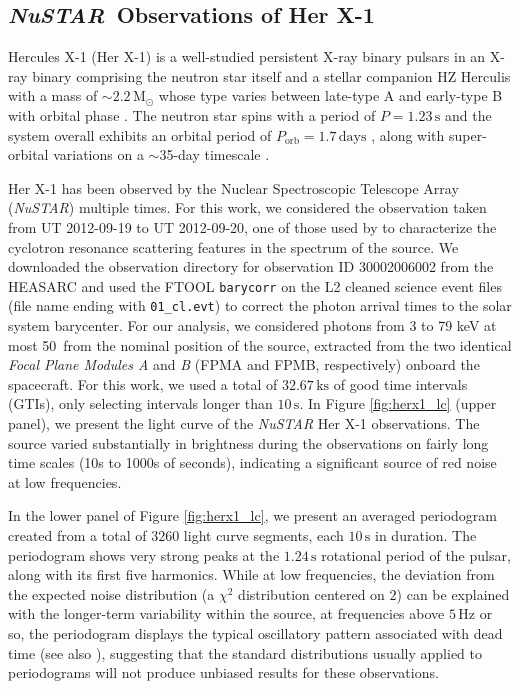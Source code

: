 \documentclass[12pt]{emulateapj}
\newcommand{\project}[1]{\textsl{#1}}
\newcommand{\nustar}{\project{NuSTAR}\xspace}
\begin{document}
\subsection{\nustar\ Observations of Her X-1}

\begin{bf}
Hercules X-1 (Her X-1) is a well-studied persistent X-ray binary pulsars \citep{tananbaum1972} in an X-ray binary comprising the neutron star itself and a stellar companion HZ Herculis \citep{davidsen1972,forman1972,bahcall1972} with a mass of $\sim$$2.2 \,\mathrm{M}_\odot$ \citep{reynolds1997,leahy2014} whose type varies between late-type A and early-type B with orbital phase \citep{anderson1994,cheng1995} . The neutron star spins with a period of $P = 1.23\,\mathrm{s}$ \citep{tananbaum1972} and the system overall exhibits an orbital period of $P_\mathrm{orb} = 1.7\,\mathrm{days}$ \citep{bahcall1972}, along with super-orbital variations on a $\sim$35-day timescale \citep{giacconi1973,scott1999,igna2011}.

Her X-1 has been observed by the Nuclear Spectroscopic Telescope Array (\nustar) multiple times. 
For this work, we considered the observation taken from UT 2012-09-19 to UT 2012-09-20, one of those used by \citet{fuerst13} to characterize the cyclotron resonance scattering features in the spectrum of the source.
We downloaded the observation directory for observation ID 30002006002 from the HEASARC and used the FTOOL \texttt{barycorr} on the L2 cleaned science event files (file name ending with \verb|01_cl.evt|) to correct the photon arrival times to the solar system barycenter.
For our analysis, we considered photons from 3 to 79 keV at most 50\arcsec\ from the nominal position of the source, extracted from the two identical \textit{Focal Plane Modules A} and \textit{B} (FPMA and FPMB, respectively) onboard the spacecraft.
For this work, we used a total of $32.67\,\mathrm{ks}$ of good time intervals (GTIs), only selecting intervals longer than $10\,\mathrm{s}$. In Figure \ref{fig:herx1_lc} (upper panel), we present the light curve of the \nustar Her X-1 observations. The source varied substantially in brightness during the observations on fairly long time scales (10s to 1000s of seconds), indicating a significant source of red noise at low frequencies.

In the lower panel of Figure \ref{fig:herx1_lc}, we present an averaged periodogram created from a total of $3260$ light curve segments, each $10\,\mathrm{s}$ in duration. The periodogram shows very strong peaks at the $1.24\,\mathrm{s}$ rotational period of the pulsar, along with its first five harmonics. While at low frequencies, the deviation from the expected noise distribution (a $\chi^2$ distribution centered on $2$) can be explained with the longer-term variability within the source, at frequencies above $5 \,\mathrm{Hz}$ or so, the periodogram displays the typical oscillatory pattern associated with dead time (see also \citealt{Bachetti+15}), suggesting that the standard distributions usually applied to periodograms will not produce unbiased results for these observations.


\end{bf}
\end{document}
